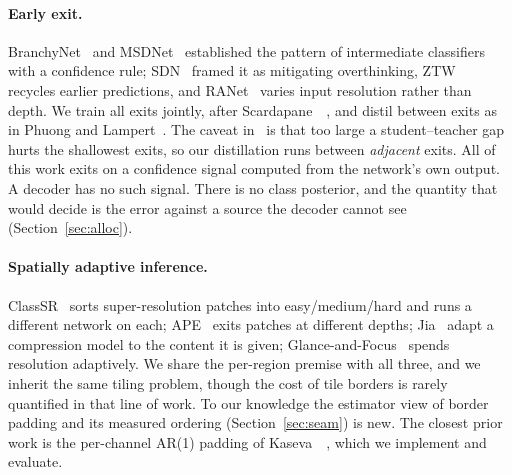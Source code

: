 \documentclass[10pt,twocolumn,letterpaper]{article}
\begin{document}
\paragraph{Early exit.} BranchyNet~\cite{branchynet} and MSDNet~\cite{msdnet}
established the pattern of intermediate classifiers with a confidence rule;
SDN~\cite{sdn} framed it as mitigating overthinking, ZTW~\cite{ztw} recycles
earlier predictions, and RANet~\cite{ranet} varies input resolution rather than
depth. We train all exits jointly, after
Scardapane~\etal~\cite{scardapane2020}, and distil between exits as in Phuong
and Lampert~\cite{phuong2019}. The caveat in~\cite{msd2024} is that too large a
student--teacher gap hurts the shallowest exits, so our distillation runs
between \emph{adjacent} exits. All of this work exits on a confidence signal
computed from the network's own output. A decoder has no such signal. There is
no class posterior, and the quantity that would decide is the error against a
source the decoder cannot see (Section~\ref{sec:alloc}).

\paragraph{Spatially adaptive inference.} ClassSR~\cite{classsr} sorts
super-resolution patches into easy/medium/hard and runs a different network on
each; APE~\cite{aptnet} exits patches at different depths; Jia~\etal
\cite{jia2022content} adapt a compression model to the content it is given;
Glance-and-Focus~\cite{glancefocus} spends resolution adaptively. We share the
per-region premise with all three, and we inherit the same tiling problem,
though the cost of tile borders is rarely quantified in that line of work. To
our knowledge the estimator view of border padding and its measured ordering
(Section~\ref{sec:seam}) is new. The closest prior work is the per-channel
AR(1) padding of Kaseva~\etal~\cite{arls}, which we implement and evaluate.

\begin{table}[t]
\centering
\resizebox{\columnwidth}{!}{}
\caption{\textbf{Where this sits.} What each method varies, at what
granularity, and what that costs the stream. A single new-bitstream column
cannot represent our own two modes, so the last three ask what actually changes:
whether the coded latent is new, what side data travels with it, and whether a
decoder alone can do it.}
\label{tab:positioning}
\end{table}
\end{document}
